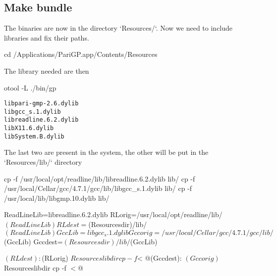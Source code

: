 \documentclass[article]{pastex}
\begin{document}
\subsection{Make bundle}

The binaries are now in the directory `Resources/`.
Now we need to include libraries and fix their paths.

\begin{code}[sh]
cd /Applications/PariGP.app/Contents/Resources 
\end{code}

The library needed are then
\begin{code}[sh]
otool -L ./bin/gp
\end{code}

\begin{alltt}
 libpari-gmp-2.6.dylib
 libgcc_s.1.dylib
 libreadline.6.2.dylib
 libX11.6.dylib
 libSystem.B.dylib
\end{alltt}

The last two are present in the system, the other will be put in the
`Resources/lib/` directory
\begin{code}[sh]
cp -f /usr/local/opt/readline/lib/libreadline.6.2.dylib lib/
cp -f /usr/local/Cellar/gcc/4.7.1/gcc/lib/libgcc_s.1.dylib lib/
cp -f /usr/local/lib/libgmp.10.dylib lib/
\end{code}

\begin{code}[make]
ReadLineLib=libreadline.6.2.dylib
RLorig=/usr/local/opt/readline/lib/$(ReadLineLib)
RLdest=$(Resourcesdir)/lib/$(ReadLineLib)
GccLib=libgcc_s.1.dylib
Gccorig=/usr/local/Cellar/gcc/4.7.1/gcc/lib/$(GccLib)
Gccdest=$(Resourcesdir)/lib/$(GccLib)

$(RLdest): $(RLorig) ${Resourceslibdir}
	cp -f $< $@

$(Gccdest): $(Gccorig) ${Resourceslibdir}
	cp -f $< $@
  
\end{code}

\end{document}
